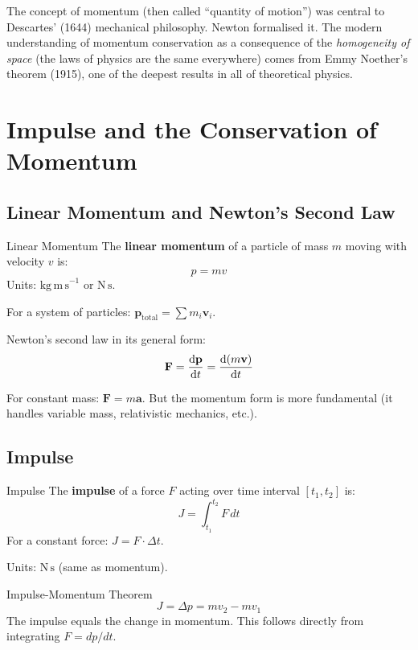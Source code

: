 \documentclass[12pt, a4paper]{book}
\newcommand{\vect}[1]{\mathbf{#1}}
\newcommand{\Fvec}{\mathbf{F}}
\newcommand{\vvec}{\mathbf{v}}
\newcommand{\avec}{\mathbf{a}}
\begin{document}
\begin{historicalbox}
The concept of momentum (then called ``quantity of motion'') was central to Descartes' (1644) mechanical philosophy. Newton formalised it. The modern understanding of momentum conservation as a consequence of the \emph{homogeneity of space} (the laws of physics are the same everywhere) comes from Emmy Noether's theorem (1915), one of the deepest results in all of theoretical physics.
\end{historicalbox}

\section{Impulse and the Conservation of Momentum}

\subsection{Linear Momentum and Newton's Second Law}

\begin{defn}{Linear Momentum}{}
The \textbf{linear momentum} of a particle of mass $m$ moving with velocity $v$ is:
\[
  p = mv
\]
Units: $\mathrm{kg\,m\,s}^{-1}$ or $\mathrm{N\,s}$.

For a system of particles: $\vect{p}_{\text{total}} = \sum m_i \vvec_i$.
\end{defn}

Newton's second law in its general form:
\[
  \Fvec = \dv{\vect{p}}{t} = \dv{(m\vvec)}{t}
\]

For constant mass: $\Fvec = m\avec$. But the momentum form is more fundamental (it handles variable mass, relativistic mechanics, etc.).

\subsection{Impulse}

\begin{defn}{Impulse}{}
The \textbf{impulse} of a force $F$ acting over time interval $[t_1, t_2]$ is:
\[
  J = \int_{t_1}^{t_2} F\,dt
\]
For a constant force: $J = F \cdot \Delta t$.

Units: $\mathrm{N\,s}$ (same as momentum).
\end{defn}

\begin{thm}{Impulse-Momentum Theorem}{}
\[
  J = \Delta p = mv_2 - mv_1
\]
The impulse equals the change in momentum. This follows directly from integrating $F = dp/dt$.
\end{thm}
\end{document}
